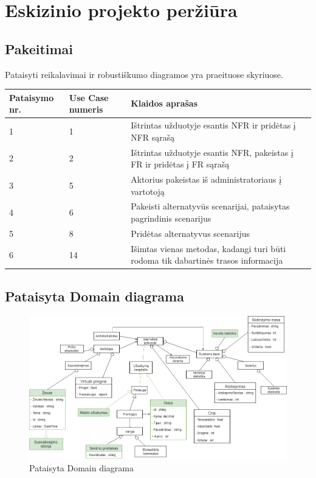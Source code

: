 \documentclass[oneside]{VUMIFPSkursinis}
\begin{document}
\section{Eskizinio projekto peržiūra}
\subsection{Pakeitimai}

Pataisyti reikalavimai ir robustiškumo diagramos yra praeituose skyriuose.
\begin{longtable}{ | p{}|p{}|p{}| }  \hline
	Pataisymo nr. & Use Case numeris & Klaidos aprašas \\ \hline
	1 & 1 & Ištrintas užduotyje esantis NFR ir pridėtas į NFR sąrašą\\ \hline
	2 & 2 & Ištrintas užduotyje esantis NFR, pakeistas į FR ir pridėtas į FR sąrašą\\ \hline
	3 & 5 & Aktorius pakeistas iš administratoriaus į vartotoją\\ \hline
	4 & 6 & Pakeisti alternatyvūs scenarijai, pataisytas pagrindinis scenarijus\\ \hline
	5 & 8 & Pridėtas alternatyvus scenarijus\\ \hline
	6 & 14 & Išimtas vienas metodas, kadangi turi būti rodoma tik dabartinės trasos informacija\\ \hline
\end{longtable}

\subsection{Pataisyta Domain diagrama}
\begin{figure}[h]
    \centering
    \includegraphics[width=1.0\textwidth]{domainfixed.png}
    \caption{Pataisyta Domain diagrama}
    \label{fig:domainfixed}
\end{figure}
\vskip 1cm
\end{document}
